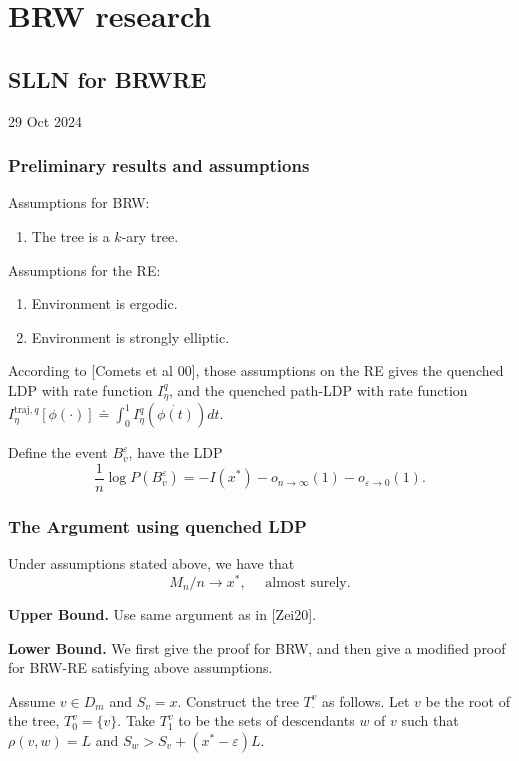 \section{BRW research}

\subsection{SLLN for BRWRE}

29 Oct 2024

\subsubsection{Preliminary results and assumptions}

Assumptions for BRW:
\begin{enumerate}
	\item The tree is a $k$-ary tree.
\end{enumerate}
Assumptions for the RE:
\begin{enumerate}
	\item Environment is ergodic.
	\item Environment is strongly elliptic.
\end{enumerate}

According to [Comets et al 00], those assumptions on the RE gives the quenched LDP with rate function $I^q_\eta$, and the quenched path-LDP with rate function $I_\eta^{\text{traj}, q}[\phi(\cdot )] \doteq \int _0^1 I_\eta^q \left( \dot{\phi(t)}\right) d t$.


Define the event $B^\varepsilon_v$, have the LDP
\[
	\frac{1}{n} \log P(B^\varepsilon_v) = - I(x^*) - o_{n \to \infty }(1) - o_{\varepsilon \to 0}(1)
.\] 


\subsubsection{The Argument using quenched LDP}



\begin{proposition}
	\label{prop:SLLN-BRWRE}
	Under assumptions stated above, we have that
	\[
		M_n / n \to x^*, \quad \text{ almost surely}
	.\] 
\end{proposition}
\textbf{Upper Bound.} Use same argument as in [Zei20]. 

\textbf{Lower Bound.} We first give the proof for BRW, and then give a modified proof for BRW-RE satisfying above assumptions.

Assume $v \in D_m$ and $S_v = x$. Construct the tree $T^v_\cdot $ as follows. Let $v$ be the root of the tree, $T^v_0 = \{v\} $. Take $T^v_1$ to be the sets of descendants $w$ of $v$ such that $\rho(v, w) = L$ and $S_w > S_v + (x^* - \varepsilon)L$.

